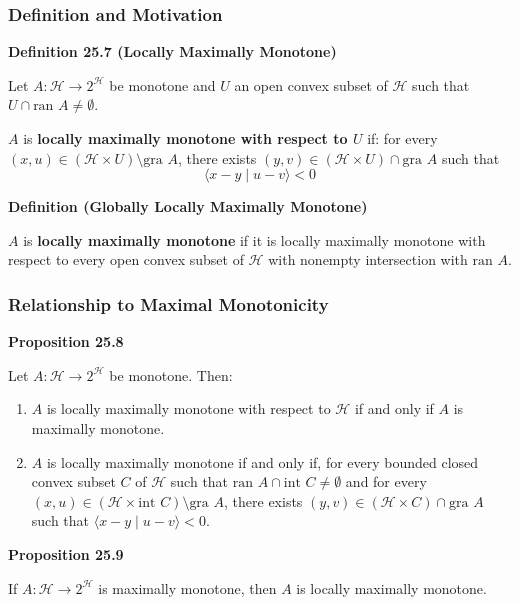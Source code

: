 \documentclass[aspectratio=169,10pt]{beamer}
\begin{document}
\begin{frame}
  \frametitle{Definition and Motivation}

  \textbf{Definition 25.7 (Locally Maximally Monotone)}

  Let $A: \mathcal{H} \to 2^{\mathcal{H}}$ be monotone and $U$ an open convex subset of $\mathcal{H}$ such that $U \cap \text{ran } A \neq \emptyset$.

  $A$ is \textbf{locally maximally monotone with respect to $U$} if: for every $(x, u) \in (\mathcal{H} \times U) \setminus \text{gra } A$,
  there exists $(y, v) \in (\mathcal{H} \times U) \cap \text{gra } A$ such that
  $$\langle x - y \mid u - v \rangle < 0$$

  \vspace{0.3cm}

  \textbf{Definition (Globally Locally Maximally Monotone)}

  $A$ is \textbf{locally maximally monotone} if it is locally maximally monotone with respect to every open convex subset of $\mathcal{H}$ with nonempty intersection with $\text{ran } A$.

\end{frame}

\begin{frame}
  \frametitle{Relationship to Maximal Monotonicity}

  \textbf{Proposition 25.8}

  Let $A: \mathcal{H} \to 2^{\mathcal{H}}$ be monotone. Then:

  \begin{enumerate}
    \item[(i)] $A$ is locally maximally monotone with respect to $\mathcal{H}$ if and only if $A$ is maximally monotone.
    \item[(ii)] $A$ is locally maximally monotone if and only if, for every bounded closed convex subset $C$ of $\mathcal{H}$
      such that $\text{ran } A \cap \text{int } C \neq \emptyset$ and for every $(x, u) \in (\mathcal{H} \times \text{int } C) \setminus \text{gra } A$,
      there exists $(y, v) \in (\mathcal{H} \times C) \cap \text{gra } A$ such that $\langle x - y \mid u - v \rangle < 0$.
  \end{enumerate}

  \vspace{0.3cm}

  \textbf{Proposition 25.9}

  If $A: \mathcal{H} \to 2^{\mathcal{H}}$ is maximally monotone, then $A$ is locally maximally monotone.

\end{frame}
\end{document}
